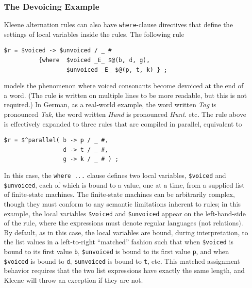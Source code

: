 \subsubsection{The Devoicing Example}

Kleene alternation rules can also have \texttt{where}-clause directives that define the settings of local variables inside the rules.  The following rule

\begin{Verbatim}
$r = $voiced -> $unvoiced / _ # 
          {where  $voiced _E_ $@(b, d, g), 
                  $unvoiced _E_ $@(p, t, k) } ;
\end{Verbatim}

\noindent
models the phenomenon where voiced consonants become devoiced at the end of a word.  (The rule is written on multiple lines to be
more readable, but this is not required.) In German, as a real-world example, the word
written \emph{Tag} is pronounced \emph{Tak}, the word written \emph{Hund} is pronounced
\emph{Hunt}. etc.  The rule above is effectively expanded to
three rules that are compiled in parallel, equivalent to

\begin{Verbatim}
$r = $^parallel( b -> p / _ #, 
                 d -> t / _ #, 
                 g -> k / _ # ) ;
\end{Verbatim}

\noindent
In this case, the \texttt{{where ...}} clause defines two local variables,
\verb!$voiced! and \verb!$unvoiced!, each of which is bound to a value, one at a
time, from a supplied list of finite-state machines.  The finite-state machines can be
arbitrarily complex, though they must conform to any semantic limitations
inherent to rules; in this example, the local variables \verb!$voiced! and \verb!$unvoiced! appear on
the left-hand-side of the rule, where the expressions must denote regular
languages (not relations).  By default, as in this case, the local variables are
bound, during interpretation, to the list values in a left-to-right ``matched''
fashion such that when \verb!$voiced! is bound to its first value \verb!b!,
\verb!$unvoiced! is
bound to its first value \verb!p!, and when \verb!$voiced! is bound to \verb!d!,
\verb!$unvoiced!
is bound to \verb!t!, etc.  This matched assignment behavior requires that the
two list expressions have exactly the same length, and Kleene will throw an
exception if they are not.  

